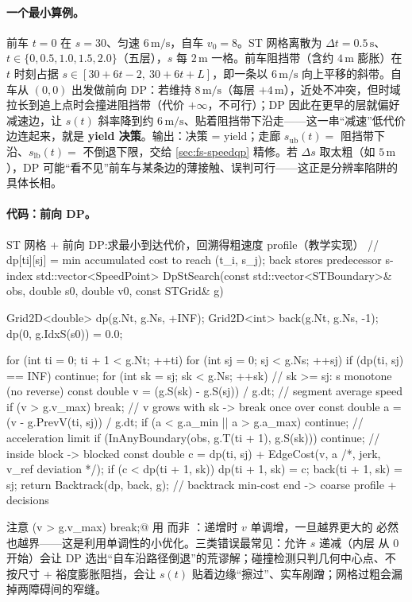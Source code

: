\paragraph{一个最小算例。}
前车 $t{=}0$ 在 $s{=}30$、匀速 $6\,\mathrm{m/s}$，自车 $v_0=8$。ST 网格离散为 $\Delta t=0.5\,\mathrm{s}$、$t\in\{0,0.5,1.0,1.5,2.0\}$（五层），$s$ 每 $2\,\mathrm{m}$ 一格。前车阻挡带（含约 $4\,\mathrm{m}$ 膨胀）在 $t$ 时刻占据 $s\in[30+6t-2,\ 30+6t+L]$，即一条以 $6\,\mathrm{m/s}$ 向上平移的斜带。自车从 $(0,0)$ 出发做前向 DP：若维持 $8\,\mathrm{m/s}$（每层 $+4\,\mathrm{m}$），近处不冲突，但时域拉长到追上点时会撞进阻挡带（代价 $+\infty$，不可行）；DP 因此在更早的层就偏好减速边，让 $s(t)$ 斜率降到约 $6\,\mathrm{m/s}$、贴着阻挡带下沿走——这一串“减速”低代价边连起来，就是 \textbf{yield 决策}。输出：决策 = yield；走廊 $s_{\mathrm{ub}}(t)=$ 阻挡带下沿、$s_{\mathrm{lb}}(t)=$ 不倒退下限，交给 \cref{sec:fs-speedqp} 精修。若 $\Delta s$ 取太粗（如 $5\,\mathrm{m}$），DP 可能“看不见”前车与某条边的薄接触、误判可行——这正是分辨率陷阱的具体长相。

\paragraph{代码：前向 DP。}
\begin{codebox}[C++]{ST 网格 + 前向 DP:求最小到达代价，回溯得粗速度 profile（教学实现）}
// dp[ti][sj] = min accumulated cost to reach (t_i, s_j); back stores predecessor s-index
std::vector<SpeedPoint> DpStSearch(const std::vector<STBoundary>& obs,
                                   double s0, double v0, const STGrid& g) {
  Grid2D<double> dp(g.Nt, g.Ns, +INF);
  Grid2D<int>    back(g.Nt, g.Ns, -1);
  dp(0, g.IdxS(s0)) = 0.0;

  for (int ti = 0; ti + 1 < g.Nt; ++ti) {
    for (int sj = 0; sj < g.Ns; ++sj) {
      if (dp(ti, sj) == INF) continue;
      for (int sk = sj; sk < g.Ns; ++sk) {            // sk >= sj: s monotone (no reverse)
        const double v = (g.S(sk) - g.S(sj)) / g.dt;  // segment average speed
        if (v > g.v_max) break;                       // v grows with sk -> break once over
        const double a = (v - g.PrevV(ti, sj)) / g.dt;
        if (a < g.a_min || a > g.a_max) continue;     // acceleration limit
        if (InAnyBoundary(obs, g.T(ti + 1), g.S(sk))) continue;  // inside block -> blocked
        const double c = dp(ti, sj) + EdgeCost(v, a /*, jerk, v_ref deviation */);
        if (c < dp(ti + 1, sk)) { dp(ti + 1, sk) = c; back(ti + 1, sk) = sj; }
      }
    }
  }
  return Backtrack(dp, back, g);  // backtrack min-cost end -> coarse profile + decisions
}
\end{codebox}
注意 \verb@if (v > g.v_max) break;@ 用 \verb@break@ 而非 \verb@continue@：\verb@sk@ 递增时 $v$ 单调增，一旦越界更大的 \verb@sk@ 必然也越界——这是利用单调性的小优化。三类错误最常见：允许 $s$ 递减（内层 \verb@sk@ 从 $0$ 开始）会让 DP 选出“自车沿路径倒退”的荒谬解；碰撞检测只判几何中心点、不按尺寸 + 裕度膨胀阻挡，会让 $s(t)$ 贴着边缘“擦过”、实车剐蹭；网格过粗会漏掉两障碍间的窄缝。

